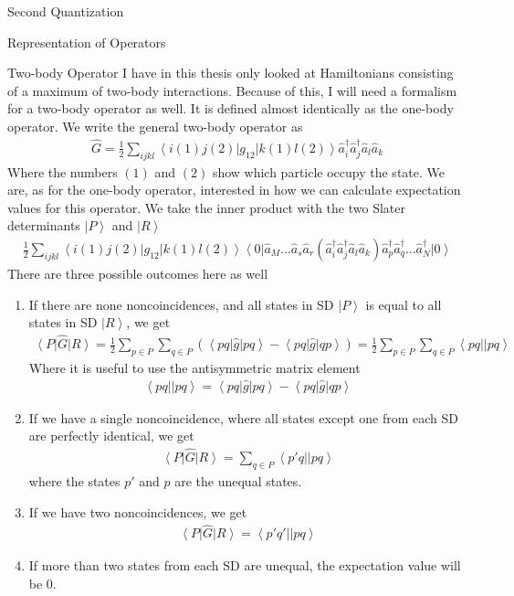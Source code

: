 \documentclass[twoside,english]{uiofysmaster}
\begin{document}
\begin{chapter}{Second Quantization}
\begin{section}{Representation of Operators}
		\begin{subsection}{Two-body Operator}
			I have in this thesis only looked at Hamiltonians consisting of a maximum of two-body interactions. Because of this, I will need a formalism for a two-body operator as well. It is defined almost identically as the one-body operator. We write the general two-body operator as
			\begin{align}
				\hat G = \frac{1}{2} \sum_{ijkl} \left< i(1) j(2) \right| g_{12} \left| k(1) l(2) \right> \hat a_i^\dagger \hat a_j^\dagger \hat a_l \hat a_k
			\end{align}
			Where the numbers $(1)$ and $(2)$ show which particle occupy the state. We are, as for the one-body operator, interested in how we can calculate expectation values for this operator. We take the inner product with the two Slater determinants $\left| P \right>$ and $\left| R\right>$
			\begin{align}
				\frac{1}{2} \sum_{ijkl} \left< i(1) j(2) \right| g_{12} \left| k(1) l(2) \right>   \left< 0 \right| \hat a_M ... \hat a_s \hat a_r (\hat a_i^\dagger \hat a_j^\dagger \hat a_l \hat a_k) \hat a_p^\dagger \hat a_q^\dagger ... \hat a_N^\dagger \left| 0 \right>
			\end{align}
			There are three possible outcomes here as well 
			\begin{enumerate}
				\item If there are none noncoincidences, and all states in SD $\left| P \right>$ is equal to all states in SD $\left| R \right>$, we get 
				\begin{align}
				 	\left< P \right| \hat G \left| R \right> = \frac{1}{2}\sum_{p \in P}\sum_{q \in P} (\left< pq\right| \hat g \left| pq \right> - \left< pq\right| \hat g \left| qp \right> ) = \frac{1}{2}\sum_{p \in P}\sum_{q \in P} \left< pq || pq \right>
				\end{align}
				Where it is useful to use the antisymmetric matrix element
				\begin{align}
					\left< pq || pq \right> = \left< pq\right| \hat g \left| pq \right> - \left< pq\right| \hat g \left| qp \right>  
				\end{align}
				\item If we have a single noncoincidence, where all states except one from each SD are perfectly identical, we get \cite{ShavittAndBartlett}
				\begin{align}
					\left< P \right| \hat G \left| R \right> = \sum_{q \in P} \left< p' q || p q \right>
				\end{align}
				where the states $p'$ and $p$ are the unequal states. 
				\item If we have two noncoincidences, we get 
				\begin{align}
					\left< P \right| \hat G \left| R \right> = \left< p' q' || p q \right> 
				\end{align}
				\item If more than two states from each SD are unequal, the expectation value will be $0$.
			\end{enumerate}
		\end{subsection}


\end{section}
\end{chapter}
\end{document}
